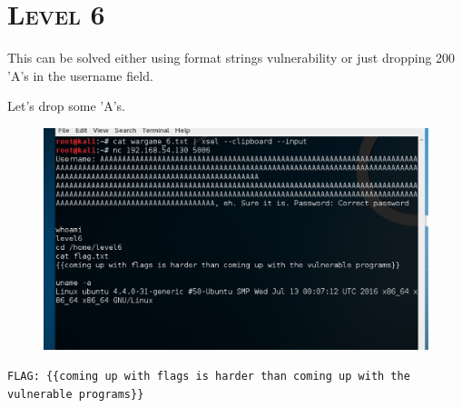 \documentclass[12pt, bibliography=totocnumbered]{article}
\newcommand{\ssection}[1]{%
  \section[#1]{\centering\normalfont\scshape #1}}
\begin{document}
\newpage
\ssection{\textbf{Level 6}}

This can be solved either using format strings vulnerability or just dropping 200 'A's in the username field.

Let's drop some 'A's.


\begin{figure}[H]
\centerline{\includegraphics[width=1\textwidth]{img/6/1.png}}
\end{figure}

\texttt{FLAG: \{\{coming up with flags is harder than coming up with the vulnerable programs\}\}}






\newpage
\thispagestyle{empty}
\phantom{a}
\vfill
{}
\vfill
\end{document}
